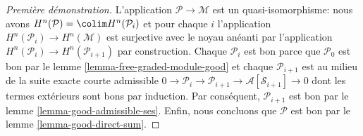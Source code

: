 \begin{proof}[Première démonstration]
\medskip\noindent
L'application $\mathcal{P} \to \mathcal{M}$ est un quasi-isomorphisme: nous avons $H^n(\mathcal{P}) = \colim H^n(\mathcal{P}_i)$ et pour chaque $i$ l'application $H^n(\mathcal{P}_i) \to H^n(\mathcal{M})$ est surjective avec le noyau anéanti par l'application $H^n(\mathcal{P}_i) \to H^n(\mathcal{P}_{i + 1})$ par construction.
Chaque $\mathcal{P}_i$ est bon parce que $\mathcal{P}_0$ est bon par le lemme \ref{lemma-free-graded-module-good}  et chaque $\mathcal{P}_{i + 1}$ est au milieu de la suite exacte courte admissible $0 \to \mathcal{P}_i \to \mathcal{P}_{i + 1} \to \mathcal{A}[\mathcal{S}_{i + 1}] \to 0$ dont les termes extérieurs sont bons par induction.
Par conséquent, $\mathcal{P}_{i + 1}$ est bon par le lemme \ref{lemma-good-admissible-ses}.
Enfin, nous concluons que $\mathcal{P}$ est bon par le lemme \ref{lemma-good-direct-sum}.
\end{proof}

